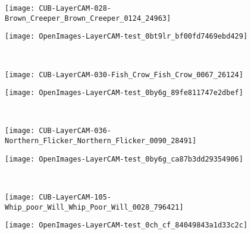 \documentclass[twocolumn]{article}
\theoremstyle{definition}
\begin{document}
\begin{figure*}
     \begin{subfigure}[b]{0.49\textwidth}
         \centering
         \texttt{[image: CUB-LayerCAM-028-Brown\_Creeper\_Brown\_Creeper\_0124\_24963]}
     \end{subfigure}
     \hfill
     \begin{subfigure}[b]{0.49\textwidth}
         \centering
         \texttt{[image: OpenImages-LayerCAM-test\_0bt9lr\_bf00fd7469ebd429]}
     \end{subfigure}
     \\
     \vspace{0.1cm}
     \begin{subfigure}[b]{0.49\textwidth}
         \centering
         \texttt{[image: CUB-LayerCAM-030-Fish\_Crow\_Fish\_Crow\_0067\_26124]}
     \end{subfigure}
     \hfill
     \begin{subfigure}[b]{0.49\textwidth}
         \centering
         \texttt{[image: OpenImages-LayerCAM-test\_0by6g\_89fe811747e2dbef]}
     \end{subfigure}
      \\
     \vspace{0.1cm}
     \begin{subfigure}[b]{0.49\textwidth}
         \centering
         \texttt{[image: CUB-LayerCAM-036-Northern\_Flicker\_Northern\_Flicker\_0090\_28491]}
     \end{subfigure}
     \hfill
     \begin{subfigure}[b]{0.49\textwidth}
         \centering
         \texttt{[image: OpenImages-LayerCAM-test\_0by6g\_ca87b3dd29354906]}
     \end{subfigure}
      \\
     \vspace{0.1cm}
     \begin{subfigure}[b]{0.49\textwidth}
         \centering
         \texttt{[image: CUB-LayerCAM-105-Whip\_poor\_Will\_Whip\_Poor\_Will\_0028\_796421]}
     \end{subfigure}
     \hfill
     \begin{subfigure}[b]{0.49\textwidth}
         \centering
         \texttt{[image: OpenImages-LayerCAM-test\_0ch\_cf\_84049843a1d33c2c]}
     \end{subfigure}
      \\
     \vspace{0.1cm}
     \begin{subfigure}[b]{0.49\textwidth}
         \centering

\end{subfigure}
\end{figure*}
\end{document}
